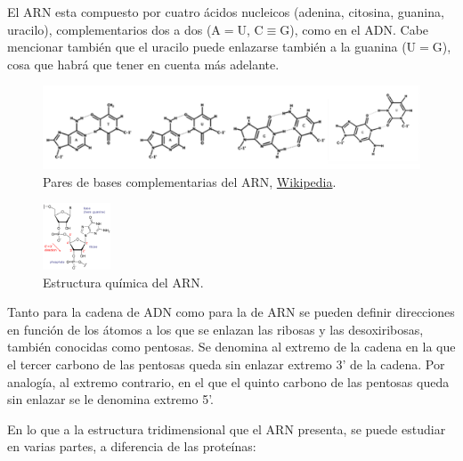 \documentclass[a4paper,11pt,titlepage]{article}
\theoremstyle{definition}
\begin{document}
El ARN esta compuesto por cuatro ácidos nucleicos (adenina, citosina, guanina, uracilo), complementarios dos a dos (A$=$U, C$\equiv$G), como en el ADN. Cabe mencionar también que el uracilo puede enlazarse también a la guanina (U$=$G), cosa que habrá que tener en cuenta más adelante.

\begin{figure}[H]
    \centering
    \includegraphics[width=\textwidth]{images/RNA_base_pairs.png}
    \small{\caption{Pares de bases complementarias del ARN, \href{https://es.wikipedia.org/wiki/Apareamiento_de_bases}{Wikipedia}.}}\normalsize
    \label{fig:RNA_base_pairs}
\end{figure}


\begin{figure}
    \begin{center}
      \includegraphics[width=0.18\textwidth]{images/RNA_chemical_structure.png}
    \end{center}
    \small{\caption{Estructura química del ARN.}}\normalsize
    \label{fig:arnchain}
\end{figure}

Tanto para la cadena de ADN como para la de ARN se pueden definir direcciones en función de los átomos a los que se enlazan las ribosas y las desoxiribosas, también conocidas como pentosas. Se denomina al extremo de la cadena en la que el tercer carbono de las pentosas queda sin enlazar extremo 3' de la cadena. Por analogía, al extremo contrario, en el que el quinto carbono de las pentosas queda sin enlazar se le denomina extremo 5'.

En lo que a la estructura tridimensional que el ARN presenta, se puede estudiar en varias partes, a diferencia de las proteínas:
\end{document}
